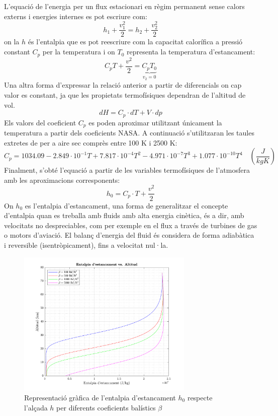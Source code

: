 L'equació de l'energia per un flux estacionari en règim permanent sense calors externs i energies internes es pot escriure com:
\begin{equation}
    h_1 + \frac{v^2_1}{2} = h_2 + \frac{v^2_2}{2}
\end{equation}
on la $h$ és l'entalpia que es pot reescriure com la capacitat calorífica a pressió constant $C_p$ per la temperatura i on $T_0$ representa la temperatura d'estancament:
\begin{equation}
    C_p T + \frac{v^2}{2} = \underbrace{C_p T_0}_{\text{$v_2 =0$}}
\end{equation}
Una altra forma d'expressar la relació anterior a partir de diferencials on cap valor es constant, ja que les propietats termofísiques dependran de l'altitud de vol.
\begin{equation}
    dH = C_p\cdot dT + V\cdot dp
\end{equation}
Els valors del coeficient $C_p$ es poden aproximar utilitzant únicament la temperatura a partir dels coeficients NASA. A continuació s'utilitzaran les taules extretes de \cite{heat_mass_transfer} per a aire sec comprès entre 100 K i 2500 K:
\begin{equation}
    C_p = 1034.09 -2.849 \cdot 10^{-1}T + 7.817 \cdot 10^{-4}T^2 - 4.971 \cdot 10^{-7}T^3 + 1.077 \cdot 10^{-10}T^4 \quad (\frac{J}{kgK})
\end{equation}
Finalment, s'obté l'equació a partir de les variables termofísiques de l'atmosfera amb les aproximacions corresponents:
\begin{equation}
    h_0 = C_p \cdot T + \frac{v^2}{2}
\end{equation}
On $h_0$ es l'entalpia d'estancament, una forma de generalitzar el concepte d'entalpia quan es treballa amb fluids amb alta energia cinètica, és a dir, amb velocitats no despreciables, com per exemple en el flux a través de turbines de gas o motors d'aviació. El balanç d'energia del fluid és considera de forma adiabàtica i reversible (isentròpicament), fins a velocitat nul·la. 

\begin{figure}[ht]
    \centering
    \includegraphics[width=0.75\textwidth]{imagenes/01_ballistic_graficas/entalpia_estancament.pdf}
    \caption{Representació gràfica de l'entalpia d'estancament $h_0$ respecte l'alçada $h$ per diferents coeficients balístics $\beta$}
    \label{fig:entalpia_estancament}
\end{figure}

